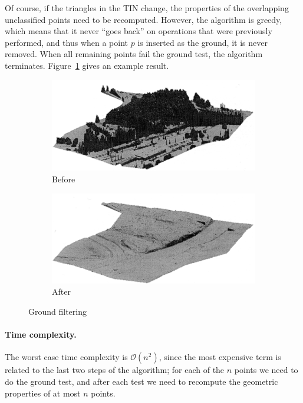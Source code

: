 Of course, if the triangles in the TIN change, the properties of the overlapping unclassified points need to be recomputed. 
However, the algorithm is greedy, which means that it never ``goes back'' on operations that were previously performed, and thus  when a point $p$ is inserted as the ground, it is never removed.
When all remaining points fail the ground test, the algorithm terminates.
Figure~\ref{fig:axelsson} gives an example result.
\begin{figure}
  \centering
  \begin{subfigure}[b]{0.48\linewidth}
    \centering
    \includegraphics[width=\textwidth]{figs/axelsson-before.png}
    \caption{Before}
  \end{subfigure}
  \quad
  \begin{subfigure}[b]{0.48\linewidth}
    \centering
    \includegraphics[width=\textwidth]{figs/axelsson-after.png}
    \caption{After}
  \end{subfigure}
\caption{Ground filtering \citep{axelsson2000generation}}%
\label{fig:axelsson}
\end{figure}

\paragraph{Time complexity.} The worst case time complexity is $\mathcal{O}(n^2)$, since the most expensive term is related to the last two steps of the algorithm; for each of the $n$ points we need to do the ground test, and after each test we need to recompute the geometric properties of at most $n$ points.


